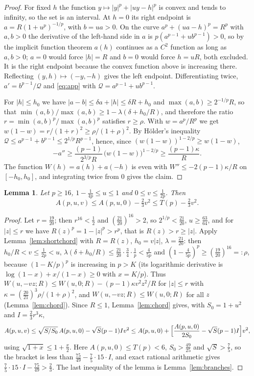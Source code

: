 \documentclass[11pt]{amsart}
\newtheorem{lemma}[theorem]{Lemma}
\theoremstyle{definition}
\theoremstyle{remark}
\numberwithin{equation}{section}
\begin{document}
\begin{proof}
For fixed $h$ the function $y\mapsto|y|^p+|uy-h|^p$ is convex and tends to infinity, so the set is an interval. At $h=0$ its right endpoint is $a=R(1+u^p)^{-1/p}$, with $b=ua>0$. On the curve $a^p+(ua-h)^p=R^p$ with $a,b>0$ the derivative of the left-hand side in $a$ is $p(a^{p-1}+ub^{p-1})>0$, so by the implicit function theorem $a(h)$ continues as a $C^2$ function as long as $a,b>0$; $a=0$ would force $|h|=R$ and $b=0$ would force $h=uR$, both excluded. It is the right endpoint because the convex function above is increasing there. Reflecting $(y,h)\mapsto(-y,-h)$ gives the left endpoint. Differentiating twice, $a'=b^{p-1}/\mathcal Q$ and \eqref{eq:app} with $\mathcal Q=a^{p-1}+ub^{p-1}$.

For $|h|\le h_0$ we have $|a-b|\le\delta a+|h|\le\delta R+h_0$ and $\max(a,b)\ge2^{-1/p}R$, so that $\min(a,b)/\max(a,b)\ge1-\lambda(\delta+h_0/R)$, and therefore the ratio $r=\min(a,b)^p/\max(a,b)^p$ satisfies $r\ge\rho$. With $w=a^p/R^p$ we get $w(1-w)=r/(1+r)^2\ge\rho/(1+\rho)^2$. By Hölder's inequality $\mathcal Q\le a^{p-1}+b^{p-1}\le2^{1/p}R^{p-1}$, hence, since $(w(1-w))^{1-2/p}\ge w(1-w)$,
\[
-a''\ge\frac{(p-1)}{2^{3/p}R}\,\bigl(w(1-w)\bigr)^{1-2/p}\ge\frac{(p-1)\kappa}{R}.
\]
The function $W(h)=a(h)+a(-h)$ is even with $W''\le-2(p-1)\kappa/R$ on $[-h_0,h_0]$, and integrating twice from $0$ gives the claim.
\end{proof}

\begin{lemma}\label{lem:chord16}
Let $p\ge16$, $1-\frac1{4p}\le u\le1$ and $0\le v\le\frac1{2p}$. Then
\[
A(p,u,v)\le A(p,u,0)-\tfrac23v^2\le T(p)-\tfrac23v^2 .
\]
\end{lemma}

\begin{proof}
Let $r=\frac{19}{20}$; then $r^{16}<\frac12$ and $(\frac{21}{20})^{16}>2$, so $2^{1/p}<\frac{21}{20}$, $u\ge\frac{63}{64}$, and for $|z|\le r$ we have $R(z)^p=1-|z|^p>r^p$, that is $R(z)>r\ge|z|$. Apply Lemma~\ref{lem:shortchord} with $R=R(z)$, $h_0=v|z|$, $\lambda=\frac{21}{20}$: then $h_0/R<v\le\frac1{2p}<u$, $\lambda(\delta+h_0/R)\le\frac{21}{20}\cdot\frac34\cdot\frac1p<\frac4{5p}$ and $(1-\frac4{5p})^p\ge(\frac{19}{20})^{16}=:\rho$, because $(1-K/p)^p$ is increasing in $p>K$ (its logarithmic derivative is $\log(1-x)+x/(1-x)\ge0$ with $x=K/p$). Thus $W(u,-vz;R)\le W(u,0;R)-(p-1)\kappa v^2z^2/R$ for $|z|\le r$ with $\kappa=(\frac{20}{21})^3\rho/(1+\rho)^2$, and $W(u,-vz;R)\le W(u,0;R)$ for all $z$ (Lemma~\ref{lem:chord}). Since $R\le1$, Lemma~\ref{lem:chord} gives, with $S_0=1+u^2$ and $I=\frac23r^3\kappa$,
\[
A(p,u,v)\le\sqrt{S/S_0}\,A(p,u,0)-\sqrt S(p-1)Iv^2\le A(p,u,0)+\Bigl[\frac{A(p,u,0)}{2S_0}-\sqrt S(p-1)I\Bigr]v^2,
\]
using $\sqrt{1+x}\le1+\frac x2$. Here $A(p,u,0)\le T(p)<6$, $S_0>\frac{49}{25}$ and $\sqrt S>\frac75$, so the bracket is less than $\frac{75}{49}-\frac75\cdot15\cdot I$, and exact rational arithmetic gives $\frac75\cdot15\cdot I-\frac{75}{49}>\frac23$. The last inequality of the lemma is Lemma~\ref{lem:branches}.
\end{proof}
\end{document}
